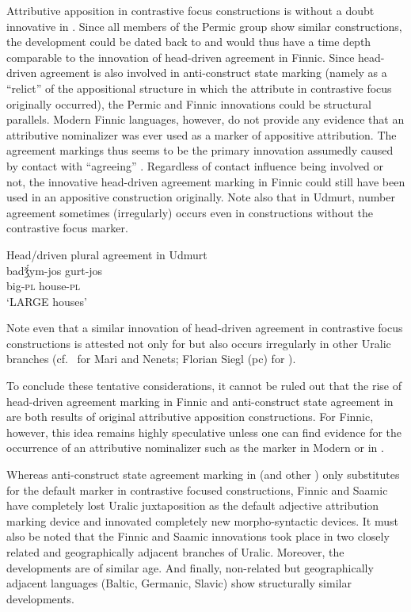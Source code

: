 {Attributive apposition in contrastive focus constructions is without a doubt innovative in . Since all members of the Permic group show similar constructions, the development could be dated back to  and would thus have a time depth comparable to the innovation of head\hyp{}driven agreement in Finnic. Since head\hyp{}driven agreement is also involved in  anti-construct state marking (namely as a “relict” of the appositional structure in which the attribute in contrastive focus originally occurred), the Permic and Finnic innovations could be structural parallels. Modern Finnic languages, however, do not provide any evidence that an attributive nominalizer was ever used as a marker of appositive attribution. The agreement markings thus seems to be the primary innovation assumedly caused by contact with “agreeing” . Regardless of contact influence being involved or not, the innovative head\hyp{}driven agreement marking in Finnic could still have been used in an appositive construction originally. Note also that in Udmurt, number agreement sometimes (irregularly) occurs even in constructions without the contrastive focus marker.
\begin{exe}
\ex \rm{Head\slash{}driven plural agreement in Udmurt \citep{winkler2001}}\\
\gll	badǯ́ym-jos gurt-jos\\
	big-\textsc{pl} house-\textsc{pl}\\
\glt	‘LARGE houses’
\end{exe}
Note even that a similar innovation of head\hyp{}driven agreement in contrastive focus constructions is attested not only for  but also occurs irregularly in other Uralic branches (cf.~\citealt[136–138, 142]{honti1997} for Mari and Nenets; Florian Siegl (pc) for ).%

To conclude these tentative considerations, it cannot be ruled out that the rise of head\hyp{}driven agreement marking in Finnic and anti-construct state agreement in  are both results of original attributive apposition constructions. For Finnic, however, this idea remains highly speculative unless one can find evidence for the occurrence of an attributive nominalizer such as the marker in Modern  or in . 

Whereas anti-construct state agreement marking in  (and other ) only substitutes for the default marker in contrastive focused constructions, Finnic and Saamic have completely lost Uralic juxtaposition as the default adjective attribution marking device and innovated completely new morpho-syntactic devices. It must also be noted that the Finnic and Saamic innovations took place in two closely related and geographically adjacent branches of Uralic. Moreover, the developments are of similar age. And finally, non-related but geographically adjacent languages (Baltic, Germanic, Slavic) show structurally similar developments.

}
